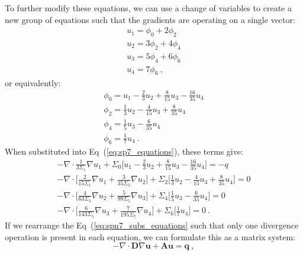 \documentclass[letterpaper,12pt]{article}
\begin{document}
To further modify these equations, we can use a change of variables to
create a new group of equations such that the gradients are operating
on a single vector:
\begin{subequations}
  \begin{gather}
    u_1 = \phi_0 + 2\phi_2 \\
    u_2 = 3\phi_2 + 4\phi_4 \\
    u_3 = 5\phi_4 + 6\phi_6 \\
    u_4 = 7\phi_6 \:,
  \end{gather}
  \label{eq:spn7_subs}
\end{subequations}
or equivalently:
\begin{subequations}
  \begin{gather}
    \phi_0 = u_1 - \frac{2}{3}u_2 + \frac{8}{15}u_3 -
    \frac{16}{35}u_4\\
    \phi_2 = \frac{1}{3}u_2 - \frac{4}{15}u_3 + \frac{8}{35}u_4\\ 
    \phi_4 = \frac{1}{5}u_3 - \frac{6}{35}u_4\\
    \phi_6 = \frac{1}{7}u_4\:.
  \end{gather}
  \label{eq:spn7_subs_inverse}
\end{subequations}
When substituted into Eq~(\ref{eq:sp7_equations}), these terms give:
\begin{subequations}
  \begin{gather}
    -\nabla \cdot \frac{1}{3 \Sigma_1} \nabla u_1 + \Sigma_0 \Bigg[
    u_1 - \frac{2}{3}u_2 + \frac{8}{15}u_3 - \frac{16}{35}u_4 \Bigg]
    = -q \\
    -\nabla \cdot \Bigg[ \frac{2}{15 \Sigma_1} \nabla u_1 +
    \frac{3}{35 \Sigma_3} \nabla u_2 \Bigg] + \Sigma_2 \Bigg[
    \frac{1}{3}u_2 - \frac{4}{15}u_3 + \frac{8}{35}u_4 \Bigg] = 0 \\
    -\nabla \cdot \Bigg[ \frac{4}{63 \Sigma_3} \nabla u_2 +
    \frac{5}{99 \Sigma_5} \nabla u_3 \Bigg] + \Sigma_4 \Bigg[
    \frac{1}{5}u_3 - \frac{6}{35}u_4 \Bigg] = 0 \\ 
    -\nabla \cdot \Bigg[ \frac{6}{143 \Sigma_5} \nabla u_3 +
    \frac{7}{195 \Sigma_7} \nabla u_4 \Bigg] + \Sigma_6 \Bigg[
    \frac{1}{7}u_4 \Bigg] = 0 \:.
  \end{gather}
  \label{eq:spn7_subs_equations}
\end{subequations}
If we rearrange the Eq~(\ref{eq:spn7_subs_equations} such that only
one divergence operation is present in each equation, we can formulate
this as a matrix system:
\begin{equation}
  -\nabla \cdot \mathbf{D} \nabla \mathbf{u} + \mathbf{A} \mathbf{u} =
  \mathbf{q}\:,
  \label{eq:spn_matrix}
\end{equation}
\end{document}
